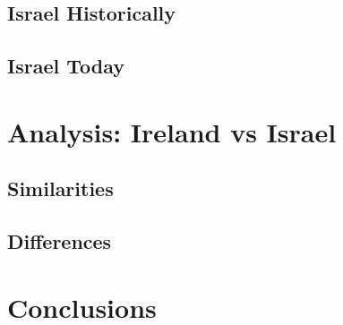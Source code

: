 \subsection{Israel Historically}


\subsection{Israel Today}




\section{Analysis: Ireland vs Israel}


\subsection{Similarities}



\subsection{Differences}



\section{Conclusions}


